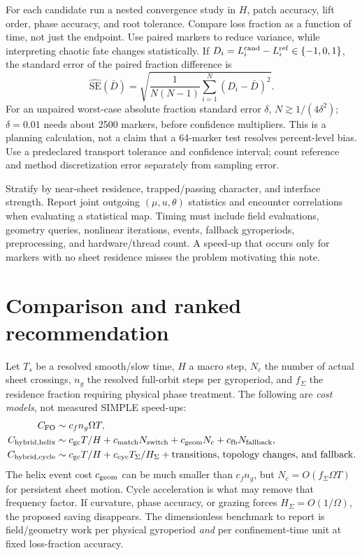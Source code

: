 \documentclass[10pt,a4paper]{article}
\begin{document}
For each candidate run a nested convergence study in $H$, patch accuracy, lift order, phase accuracy, and root tolerance. Compare loss fraction as a function of time, not just the endpoint. Use paired markers to reduce variance, while interpreting chaotic fate changes statistically. If $D_i=L_i^{\rm cand}-L_i^{\rm ref}\in\{-1,0,1\}$, the standard error of the paired fraction difference is
\begin{equation}
 \widehat{\mathrm{SE}}(\bar D)=\sqrt{\frac{1}{N(N-1)}\sum_{i=1}^N(D_i-\bar D)^2}.
\end{equation}
For an unpaired worst-case absolute fraction standard error $\delta$, $N\gtrsim1/(4\delta^2)$; $\delta=0.01$ needs about 2500 markers, before confidence multipliers. This is a planning calculation, not a claim that a 64-marker test resolves percent-level bias. Use a predeclared transport tolerance and confidence interval; count reference and method discretization error separately from sampling error.

Stratify by near-sheet residence, trapped/passing character, and interface strength. Report joint outgoing $(\mu,u,\theta)$ statistics and encounter correlations when evaluating a statistical map. Timing must include field evaluations, geometry queries, nonlinear iterations, events, fallback gyroperiods, preprocessing, and hardware/thread count. A speed-up that occurs only for markers with no sheet residence misses the problem motivating this note.

\section{Comparison and ranked recommendation}
\label{sec:rank}
Let $T_s$ be a resolved smooth/slow time, $H$ a macro step, $N_c$ the number of actual sheet crossings, $n_g$ the resolved full-orbit steps per gyroperiod, and $f_\Sigma$ the residence fraction requiring physical phase treatment. The following are \emph{cost models}, not measured SIMPLE speed-ups:
\begin{align}
 C_{\rm FO}&\sim c_f n_g\Omega T,\\
 C_{\rm hybrid,helix}&\sim c_{\rm gc}T/H+c_{\rm match}N_{\rm switch}
          +c_{\rm geom}N_c+c_{\rm fb}N_{\rm fallback},\\
 C_{\rm hybrid,cycle}&\sim c_{\rm gc}T/H+c_{\rm cyc}T_\Sigma/H_\Sigma
          +\text{transitions, topology changes, and fallback}.
\end{align}
The helix event cost $c_{\rm geom}$ can be much smaller than $c_f n_g$, but $N_c=O(f_\Sigma\Omega T)$ for persistent sheet motion. Cycle acceleration is what may remove that frequency factor. If curvature, phase accuracy, or grazing forces $H_\Sigma=O(1/\Omega)$, the proposed saving disappears. The dimensionless benchmark to report is field/geometry work per physical gyroperiod \emph{and} per confinement-time unit at fixed loss-fraction accuracy.
\end{document}

